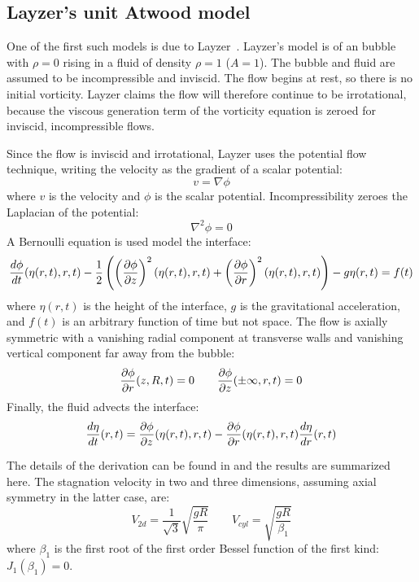 \subsection{Layzer's unit Atwood model}

One of the first such models is due to Layzer~\cite{Layzer1955}.
Layzer's model is of an bubble with $\rho = 0$ rising in a fluid of density $\rho = 1$ ($A = 1$).
The bubble and fluid are assumed to be incompressible and inviscid.
The flow begins at rest, so there is no initial vorticity.
Layzer claims the flow will therefore continue to be irrotational, because the viscous generation term of the vorticity equation is zeroed for inviscid, incompressible flows.

Since the flow is inviscid and irrotational, Layzer uses the potential flow technique, writing the velocity as the gradient of a scalar potential:
\begin{equation}
v = \nabla \phi
\end{equation}
where 
$v$ is the velocity and 
$\phi$ is the scalar potential.
Incompressibility zeroes the Laplacian of the potential:
\begin{equation}
\nabla^2 \phi = 0
\end{equation}
A Bernoulli equation is used model the interface:
\begin{equation} \label{eqn:LayzerBernoulli}
\frac{d \phi}{d t}(\eta(r,t), r, t) - \frac{1}{2} \left(\left(\frac{\partial \phi}{\partial z}\right)^2(\eta(r,t), r, t) +\left(\frac{\partial \phi}{\partial r}\right)^2(\eta(r,t), r, t)\right) - g \eta(r,t) = f(t)
\end{equation}
where 
$\eta(r,t)$ is the height of the interface,
$g$ is the gravitational acceleration, and 
$f(t)$ is an arbitrary function of time but not space.
The flow is axially symmetric with a vanishing radial component at transverse walls and vanishing vertical component far away from the bubble:
\begin{equation}
\frac{\partial \phi}{\partial r}(z,R,t) = 0 \qquad \frac{\partial \phi}{\partial z}(\pm \infty, r, t) = 0
\end{equation}
Finally, the fluid advects the interface:
\begin{equation}
\frac{d \eta}{d t}(r,t) = \frac{\partial \phi}{\partial z}(\eta(r,t), r, t) - \frac{\partial \phi}{\partial r}(\eta(r,t), r, t) \frac{d \eta}{d r}(r,t)
\end{equation}

The details of the derivation can be found in  and the results are summarized here.
The stagnation velocity in two and three dimensions, assuming axial symmetry in the latter case, are:
\begin{equation}
V_{2d} = \frac{1}{\sqrt{3}} \sqrt{\frac{g R}{\pi}}  \qquad V_{cyl} = \sqrt{\frac{g R}{\beta_1}} 
\end{equation}
where $\beta_1$ is the first root of the first order Bessel function of the first kind: $J_{1}(\beta_1) = 0$.

